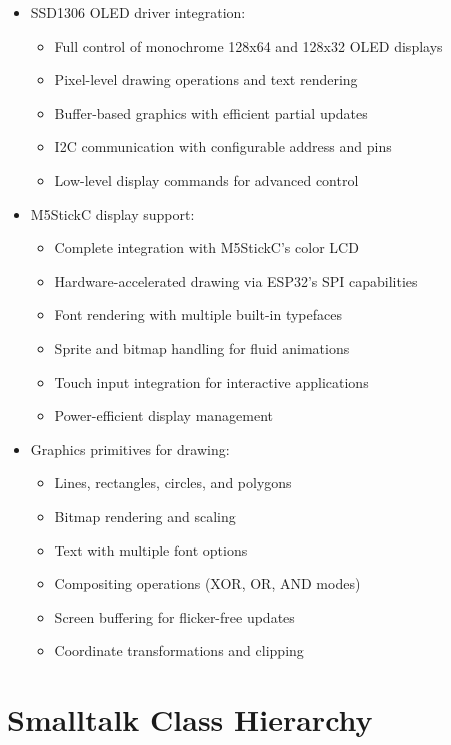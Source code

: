 \documentclass[12pt,a4paper]{report}
\begin{document}
\begin{itemize}
    \item SSD1306 OLED driver integration:
    \begin{itemize}
        \item Full control of monochrome 128x64 and 128x32 OLED displays
        \item Pixel-level drawing operations and text rendering
        \item Buffer-based graphics with efficient partial updates
        \item I2C communication with configurable address and pins
        \item Low-level display commands for advanced control
    \end{itemize}

    \item M5StickC display support:
    \begin{itemize}
        \item Complete integration with M5StickC's color LCD
        \item Hardware-accelerated drawing via ESP32's SPI capabilities
        \item Font rendering with multiple built-in typefaces
        \item Sprite and bitmap handling for fluid animations
        \item Touch input integration for interactive applications
        \item Power-efficient display management
    \end{itemize}

    \item Graphics primitives for drawing:
    \begin{itemize}
        \item Lines, rectangles, circles, and polygons
        \item Bitmap rendering and scaling
        \item Text with multiple font options
        \item Compositing operations (XOR, OR, AND modes)
        \item Screen buffering for flicker-free updates
        \item Coordinate transformations and clipping
    \end{itemize}
\end{itemize}

\chapter{Smalltalk Class Hierarchy}
\end{document}

